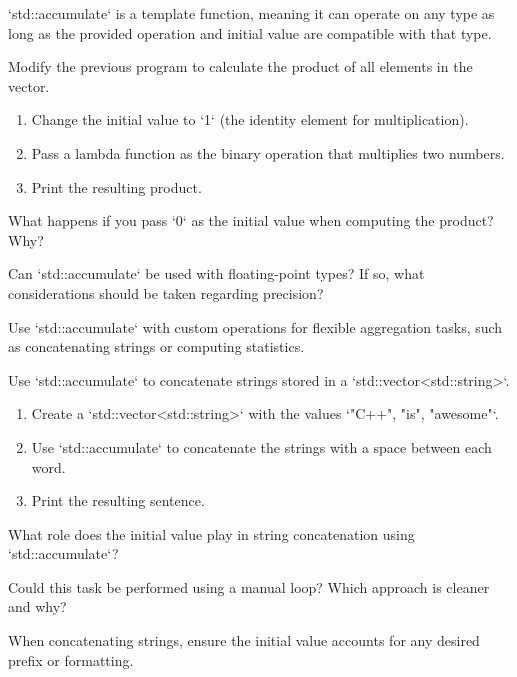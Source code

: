 \begin{challenge}
    \begin{advice}
        `std::accumulate` is a template function, meaning it can operate on any type as long as the provided operation and initial value are compatible with that type.
    \end{advice}

    \begin{task}
    Modify the previous program to calculate the product of all elements in the vector.
    \begin{enumerate}
        \item Change the initial value to `1` (the identity element for multiplication).
        \item Pass a lambda function as the binary operation that multiplies two numbers.
        \item Print the resulting product.
    \end{enumerate}
    \begin{questions}
        \item What happens if you pass `0` as the initial value when computing the product? Why?
        \item Can `std::accumulate` be used with floating-point types? If so, what considerations should be taken regarding precision?
    \end{questions}
    \end{task}

    \begin{advice}
        Use `std::accumulate` with custom operations for flexible aggregation tasks, such as concatenating strings or computing statistics.
    \end{advice}

    \begin{task}
    Use `std::accumulate` to concatenate strings stored in a `std::vector<std::string>`.
    \begin{enumerate}
        \item Create a `std::vector<std::string>` with the values `{"C++", "is", "awesome"}`.
        \item Use `std::accumulate` to concatenate the strings with a space between each word.
        \item Print the resulting sentence.
    \end{enumerate}
    \begin{questions}
        \item What role does the initial value play in string concatenation using `std::accumulate`?
        \item Could this task be performed using a manual loop? Which approach is cleaner and why?
    \end{questions}
    \end{task}

    \begin{advice}
        When concatenating strings, ensure the initial value accounts for any desired prefix or formatting.
    \end{advice}

\end{challenge}
